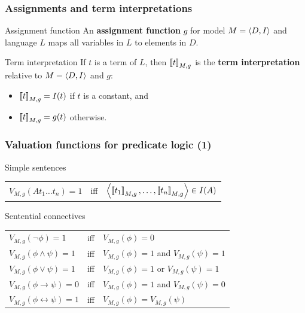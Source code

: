 \documentclass[fleqn,10pt,serif,xcolor=svgnames,xcolor=table,aspectratio=169,handout]{beamer}
\renewcommand{\mymark}[1]{\textbf{{\textcolor{themecolor}{ #1}}}}
\begin{document}
\begin{frame}
  \frametitle{Assignments and term interpretations}

  \begin{block}{Assignment function}
    An \mymark{assignment function} $g$ for model $M = \left \langle D,I\right\rangle$ and language $L$ maps all
    variables in $L$ to elements in $D$.
  \end{block}

  \begin{block}{Term interpretation}
    If $t$ is a term of $L$, then $\left [\! \left [ t \right ]\! \right]_{M,g}$ is the \mymark{term interpretation} relative to $M = \left \langle D,I\right\rangle$ and $g$:
    \begin{multicols}{2}
      \begin{itemize}
      \item[] $\left [\! \left [ t \right ]\! \right]_{M,g} = I(t)$ if $t$ is a constant, and
      \item[] $\left [\! \left [ t \right ]\! \right]_{M,g} = g(t)$ otherwise.
      \end{itemize}
    \end{multicols}

  \end{block}

\end{frame}

\begin{frame}
  \frametitle{Valuation functions for predicate logic (1)}

  \begin{block}{Simple sentences}
    \begin{tabular}{lcl}
      $V_{M,g}(At_1\dots t_n) =1$ & iff & $\left \langle \left [\! \left [ t_1 \right ]\! \right]_{M,g}, \dots, \left [\! \left [ t_n \right ]\! \right]_{M,g}\right\rangle \in I(A)$
    \end{tabular}
  \end{block}

\begin{block}{Sentential connectives}
    \begin{tabular}{lcl}
      $V_{M,g}(\neg \phi) = 1$ & iff & $V_{M,g}(\phi) =0$\\
      $V_{M,g}(\phi \wedge \psi) = 1$ & iff & $V_{M,g}(\phi) =1$ and $V_{M,g}(\psi) = 1$\\
      $V_{M,g}(\phi \vee \psi) = 1$ & iff & $V_{M,g}(\phi) =1$ or $V_{M,g}(\psi) = 1$\\
      $V_{M,g}(\phi \rightarrow \psi) = 0$ & iff & $V_{M,g}(\phi) =1$ and $V_{M,g}(\psi) = 0$\\
      $V_{M,g}(\phi \leftrightarrow \psi) = 1$ & iff & $V_{M,g}(\phi) = V_{M,g}(\psi)$
    \end{tabular}
  \end{block}

\end{frame}
\end{document}
